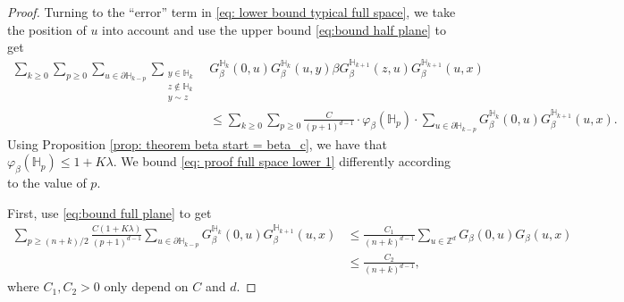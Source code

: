 \documentclass[10pt,a4paper]{amsart}
\begin{document}
\begin{proof}
Turning to the ``error'' term in \eqref{eq: lower bound typical full space}, we take the position of $u$ into account and use the upper bound \eqref{eq:bound half plane} to get 
\begin{align}
		\sum_{k\geq 0}\sum_{p\geq 0}\sum_{u\in \partial \mathbb H_{k-p}}\sum_{\substack{y\in \mathbb H_k\\z\notin \mathbb H_k\\y\sim z}} &G_\beta^{\mathbb H_k}(0,u)G_\beta^{\mathbb H_k}(u,y)\beta G_\beta^{\mathbb H_{k+1}}(z,u)G_\beta^{\mathbb H_{k+1}}(u,x)\nonumber
		\\&\leq \sum_{k\geq 0}\sum_{p\geq 0}\frac{C}{(p+1)^{d-1}}\cdot \varphi_\beta(\mathbb H_p)\cdot \sum_{u\in \partial \mathbb H_{k-p}}G_\beta^{\mathbb H_k}(0,u)G_\beta^{\mathbb H_{k+1}}(u,x).\label{eq: proof full space lower 1}
		\end{align}
Using Proposition \ref{prop: theorem beta start = beta_c}, we have that $\varphi_\beta(\mathbb H_p)\leq 1+K\lambda$. We bound \eqref{eq: proof full space lower 1} differently according to the value of $p$. 

First, use \eqref{eq:bound full plane} to get
\begin{align}
	\sum_{p\geq (n+k)/2}\frac{C(1+K\lambda)}{(p+1)^{d-1}}\sum_{u\in \partial \mathbb H_{k-p}}G_\beta^{\mathbb H_k}(0,u)G_\beta^{\mathbb H_{k+1}}(u,x)&\leq \frac{C_1}{(n+k)^{d-1}}\sum_{u\in \mathbb Z^d}G_{\beta}(0,u)G_{\beta}(u,x)
	\\&\leq \frac{C_2}{(n+k)^{d-1}},\label{eq: proof full space lower 2}
\end{align} where $C_1,C_2>0$ only depend on $C$ and $d$.
%


\end{proof}
\end{document}
